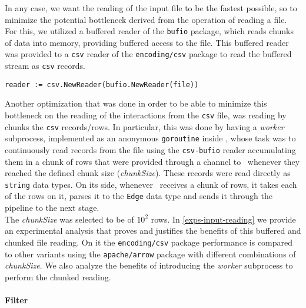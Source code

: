 In any case, we want the reading of the input file to be the fastest possible, so to minimize the potential bottleneck derived from the operation of reading a file. For this, we utilized a buffered reader of the \texttt{bufio} package, which reads chunks of data into memory, providing buffered access to the file. This buffered reader was provided to a \texttt{csv} reader of the \texttt{encoding/csv} package to read the buffered stream as \texttt{csv} records.

    \begin{center}
    \lstset{style=golangStyle}
    \begin{lstlisting}[caption={\texttt{csv-bufio} reader}]
        reader := csv.NewReader(bufio.NewReader(file))
    \end{lstlisting}
    \end{center}
    
Another optimization that was done in order to be able to minimize this bottleneck on the reading of the interactions from the \texttt{csv} file, was reading by chunks the \texttt{csv} records/rows. In particular, this was done by having a \textit{worker} subprocess, implemented as an anonymous \texttt{goroutine} inside \Sr, whose task was to continuously read records from the file using the \texttt{csv-bufio} reader accumulating them in a chunk of rows that were provided through a channel to \Sr\ whenever they reached the defined chunk size  (\emph{chunkSize}). These records were read directly as \texttt{string} data types. On its side, whenever \Sr\ receives a chunk of rows, it takes each of the rows on it, parses it to the \texttt{Edge} data type and sends it through the pipeline to the next stage.\\

The \emph{chunkSize} was selected to be of $10^2$ rows. In \ref{exps-input-reading} we provide an experimental analysis that proves and justifies the benefits of this buffered and chunked file reading. On it the \texttt{encoding/csv} package performance is compared to other variants using the \texttt{apache/arrow} package with different combinations of \emph{chunkSize}. We also analyze the benefits of introducing the \textit{worker} subprocess to perform the chunked reading.

\paragraph*{Filter\\\\}

